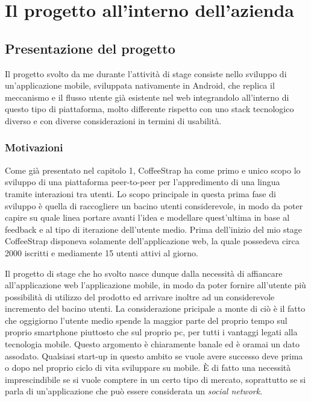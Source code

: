 
\chapter{Il progetto all'interno dell'azienda}
\label{cap:progetto-azienda}

\section{Presentazione del progetto}

Il progetto svolto da me durante l'attività di stage consiste nello sviluppo di un'applicazione mobile, sviluppata nativamente in Android, che replica il meccanismo e il flusso utente già esistente nel web integrandolo all'interno di questo tipo di piattaforma, molto differente rispetto con uno stack tecnologico diverso e con diverse considerazioni in termini di usabilità.

\subsection{Motivazioni}

Come già presentato nel capitolo 1, CoffeeStrap ha come primo e unico scopo lo sviluppo di una piattaforma peer-to-peer per l'appredimento di una lingua tramite interazioni tra utenti. Lo scopo principale in questa prima fase di sviluppo è quella di raccogliere un bacino utenti considerevole, in modo da poter capire su quale linea portare avanti l'idea e modellare quest'ultima in base al feedback e al tipo di iterazione dell'utente medio. Prima dell'inizio del mio stage CoffeeStrap disponeva solamente dell'applicazione web, la quale possedeva circa 2000 iscritti e mediamente 15 utenti attivi al giorno. 

Il progetto di stage che ho svolto nasce dunque dalla necessità di affiancare all'applicazione web l'applicazione mobile, in modo da poter fornire all'utente più possibilità di utilizzo del prodotto ed arrivare inoltre ad un considerevole incremento del bacino utenti. La considerazione pricipale a monte di ciò è il fatto che oggigiorno l'utente medio spende la maggior parte del proprio tempo sul proprio smartphone piuttosto che sul proprio pc, per tutti i vantaggi legati alla tecnologia mobile. Questo argomento è chiaramente banale ed è oramai un dato assodato. Qualsiasi start-up in questo ambito se vuole avere successo deve prima o dopo nel proprio ciclo di vita sviluppare su mobile. È di fatto una necessità imprescindibile se si vuole comptere in un certo tipo di mercato, soprattutto se si parla di un'applicazione che può essere considerata un \textit{social network}.

